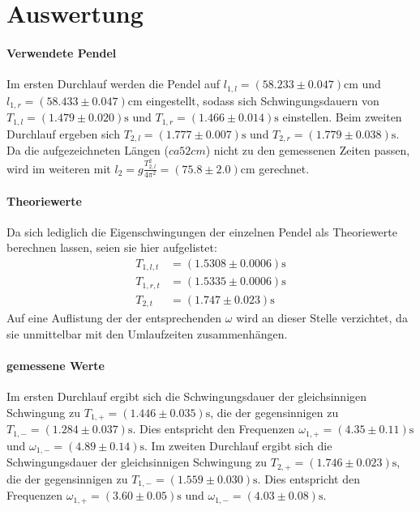 \section{Auswertung}
\label{sec:Auswertung}

\paragraph{Verwendete Pendel}
Im ersten Durchlauf werden die Pendel auf $l_{1,l} =(58.233 \pm 0.047)\si{\centi\meter}$ und $l_{1,r} =(58.433 \pm 0.047)\si{\centi\meter}$ eingestellt, sodass sich Schwingungsdauern von $T_{1,l} =(1.479 \pm 0.020)\si{\second}$ und $T_{1,r} = (1.466 \pm 0.014)\si{\second}$ einstellen.
Beim zweiten Durchlauf ergeben sich $T_{2,l}=(1.777 \pm 0.007)\si{\second}$ und $T_{2,r} = (1.779 \pm 0.038)\si{\second}$. Da die aufgezeichneten Längen ($ca 52cm$) nicht zu den gemessenen Zeiten passen, wird im weiteren mit $l_2 = g \frac{T_{2,l}^2}{4\pi ^2} = (75.8 \pm 2.0) \si{\centi \meter}$ gerechnet.

\paragraph{Theoriewerte}
Da sich lediglich die Eigenschwingungen der einzelnen Pendel als Theoriewerte berechnen lassen, seien sie hier aufgelistet:
\begin{align*}
  T_{1,l,t} &= (1.5308 \pm 0.0006) \si{\second}   \\
  T_{1,r,t} &=  (1.5335 \pm 0.0006) \si{\second}  \\
  T_{2,t} &= (1.747 \pm 0.023) \si{\second}
\end{align*}
Auf eine Auflistung der der entsprechenden $\omega$ wird an dieser Stelle verzichtet, da sie unmittelbar mit den Umlaufzeiten zusammenhängen.

\paragraph{gemessene Werte}
Im ersten Durchlauf ergibt sich die Schwingungsdauer der gleichsinnigen Schwingung zu $T_{1,+} = (1.446 \pm 0.035)\si{\second}$, die der gegensinnigen zu $T_{1,-} = (1.284 \pm 0.037)\si{\second}$. Dies entspricht den Frequenzen $\omega_{1,+} = (4.35 \pm 0.11)\si{\second}$ und $\omega_{1,-} = (4.89 \pm 0.14)\si{\second}$.
Im zweiten Durchlauf ergibt sich die Schwingungsdauer der gleichsinnigen Schwingung zu $T_{2,+} = (1.746 \pm 0.023)\si{\second}$, die der gegensinnigen zu $T_{1,-} = (1.559 \pm 0.030)\si{\second}$. Dies entspricht den Frequenzen $\omega_{1,+} = (3.60 \pm 0.05)\si{\second}$ und $\omega_{1,-} = (4.03 \pm 0.08)\si{\second}$.


